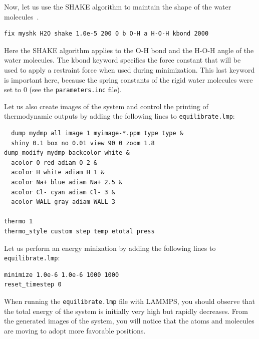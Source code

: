 \documentclass[9pt,tutorial]{livecoms}
\newcommand{\lmpcmd}[1]{\hspace{0pt}\colorbox{listing}{\textcolor{command}{\small{#1}}}\hspace{0pt}} %
\newcommand{\flecmd}[1]{\textcolor{command}{\texttt{#1}}} %
\begin{document}
Now, let us use the SHAKE algorithm to maintain the shape of the
water molecules~\cite{ryckaert1977numerical, andersen1983rattle}.
\begin{lstlisting}
fix myshk H2O shake 1.0e-5 200 0 b O-H a H-O-H kbond 2000
\end{lstlisting}
Here the SHAKE algorithm applies to the \lmpcmd{O-H} bond and the \lmpcmd{H-O-H} angle
of the water molecules.  The \lmpcmd{kbond} keyword specifies the force constant that will be
used to apply a restraint force when used during minimization.  This last keyword is important
here, because the spring constants of the rigid water molecules were set
to 0 (see the \flecmd{parameters.inc} file).

Let us also create images of the system and control
the printing of thermodynamic outputs by adding the following lines
to \flecmd{equilibrate.lmp}:
\begin{lstlisting}
  dump mydmp all image 1 myimage-*.ppm type type &
  shiny 0.1 box no 0.01 view 90 0 zoom 1.8
dump_modify mydmp backcolor white &
  acolor O red adiam O 2 &
  acolor H white adiam H 1 &
  acolor Na+ blue adiam Na+ 2.5 &
  acolor Cl- cyan adiam Cl- 3 &
  acolor WALL gray adiam WALL 3

thermo 1
thermo_style custom step temp etotal press
\end{lstlisting}

Let us perform an energy minization by adding the following lines to \flecmd{equilibrate.lmp}:
\begin{lstlisting}
minimize 1.0e-6 1.0e-6 1000 1000
reset_timestep 0
\end{lstlisting}
When running the \flecmd{equilibrate.lmp} file with LAMMPS, you should observe that the
total energy of the system is initially very high but rapidly decreases.  From the generated
images of the system, you will notice that the atoms and molecules are moving to adopt more favorable positions.
\end{document}
